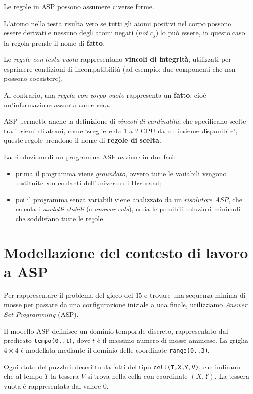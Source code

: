 Le regole in ASP possono assumere diverse forme.

L’atomo nella testa risulta vero se tutti gli atomi positivi nel corpo possono essere derivati e nessuno degli atomi negati (\textit{not} $c_j$) lo può essere, in questo caso la regola prende il nome di \textbf{fatto}.

Le \textit{regole con testa vuota} rappresentano \textbf{vincoli di integrità}, utilizzati per esprimere condizioni di incompatibilità (ad esempio: due componenti che non possono coesistere).

Al contrario, una \textit{regola con corpo vuoto} rappresenta un \textbf{fatto}, cioè un'informazione assunta come vera.

ASP permette anche la definizione di \textit{vincoli di cardinalità}, che specificano scelte tra insiemi di atomi, come `scegliere da 1 a 2 CPU da un insieme disponibile', queste regole prendono il nome di \textbf{regole di scelta}.

La risoluzione di un programma ASP avviene in due fasi: ~\cite{13}
\begin{itemize}
    \item prima il programma viene \textit{groundato}, ovvero tutte le variabili vengono sostituite con costanti dell’universo di Herbrand;
    \item poi il programma senza variabili viene analizzato da un \textit{risolutore ASP}, che calcola i \textit{modelli stabili} (o \textit{answer sets}), ossia le possibili soluzioni minimali che soddisfano tutte le regole.
\end{itemize}

\section{Modellazione del contesto di lavoro a ASP}
Per rappresentare il problema del gioco del 15 e trovare una sequenza minima di mosse per passare da una configurazione iniziale a una finale, utilizziamo \emph{Answer Set Programming} (ASP).

Il modello ASP definisce un dominio temporale discreto, rappresentato dal predicato
\texttt{tempo(0..t)}, dove \( t \) è il massimo numero di mosse ammesse. 
La griglia \(4 \times 4\) è modellata mediante il dominio delle coordinate \texttt{range(0..3)}.

Ogni stato del puzzle è descritto da fatti del tipo \texttt{cell(T,X,Y,V)}, che indicano che al tempo \( T \) la tessera \( V \) si trova nella cella con coordinate \((X,Y)\). La tessera vuota è rappresentata dal valore \(0\).

